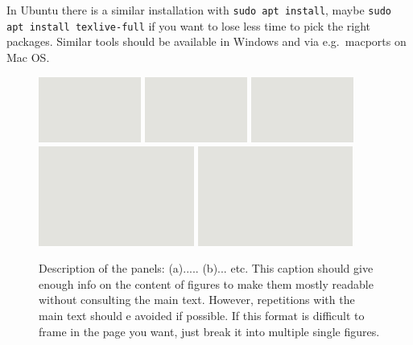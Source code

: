\documentclass[prl,twocolumn]{revtex4-1}
\begin{document}
\vspace{0.2cm}
In Ubuntu there is a similar installation with \texttt{sudo apt install}, maybe \texttt{sudo apt install texlive-full} if you want to lose less time to pick the right packages. Similar tools should be available in Windows and via e.g.~macports on Mac OS.

\begin{figure}[!tb]
  \centering
  \includegraphics[width=0.3\textwidth]{fig1a.png}
  \hskip 1mm
  \includegraphics[width=0.3\textwidth]{fig1a.png}
  \hskip 1mm
  \includegraphics[width=0.3\textwidth]{fig1a.png}
  \vskip 1mm
  \includegraphics[width=0.455\textwidth]{fig1a.png}
  \hskip 1mm
  \includegraphics[width=0.455\textwidth]{fig1a.png}
  \caption{Description of the panels: (a)..... (b)... etc. This caption should give enough info on the content of figures to make them mostly readable without consulting the main text. However, repetitions with the main text should e avoided if possible. {\color{red} If this format is difficult to frame in the page you want, just break it into multiple single figures.}}
  \label{fig:x}
\end{figure}
\end{document}
